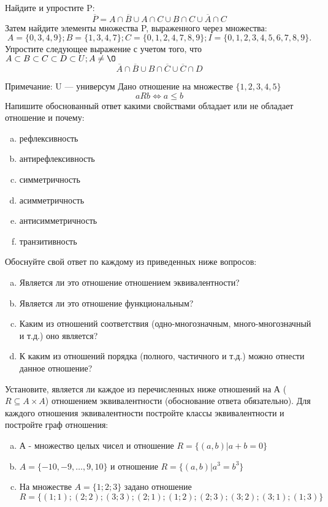\documentclass[10pt]{exam}
\begin{document}
\begin{questions}
\question
Найдите и упростите P:
\begin{equation*}
\overline{P} = A \cap \overline{B} \cup A \cap C \cup B \cap C \cup \overline{A} \cap C
\end{equation*}
Затем найдите элементы множества P, выраженного через множества:
\begin{equation*}
A = \{0, 3, 4, 9\}; 
B = \{1, 3, 4, 7\};
C = \{0, 1, 2, 4, 7, 8, 9\};
I = \{0, 1, 2, 3, 4, 5, 6, 7, 8, 9\}.
\end{equation*}\question
Упростите следующее выражение с учетом того, что $A\subset B \subset C \subset D \subset U; A \neq \O$
\begin{equation*}
\overline{A} \cap \overline{B} \cup B \cap \overline{C} \cup \overline{C} \cap D
\end{equation*}

Примечание: U — универсум\question
Дано отношение на множестве $\{1, 2, 3, 4, 5\}$ 
\begin{equation*}
aRb \iff a \leq b
\end{equation*}
Напишите обоснованный ответ какими свойствами обладает или не обладает отношение и почему:   
\begin{enumerate} [a)]\setcounter{enumi}{0}
\item рефлексивность
\item антирефлексивность
\item симметричность
\item асимметричность
\item антисимметричность
\item транзитивность
\end{enumerate}

Обоснуйте свой ответ по каждому из приведенных ниже вопросов:
\begin{enumerate} [a)]\setcounter{enumi}{0}
    \item Является ли это отношение отношением эквивалентности?
    \item Является ли это отношение функциональным?
    \item Каким из отношений соответствия (одно-многозначным, много-многозначный и т.д.) оно является?
    \item К каким из отношений порядка (полного, частичного и т.д.) можно отнести данное отношение?
\end{enumerate}


\question
Установите, является ли каждое из перечисленных ниже отношений на А ($R \subseteq A \times A$) отношением эквивалентности (обоснование ответа обязательно). Для каждого отношения эквивалентности 
постройте классы эквивалентности и постройте граф отношения:
\begin{enumerate}[a)]\setcounter{enumi}{0}
\item А - множество целых чисел и отношение $R = \{(a,b)|a + b = 0\}$
\item $A = \{-10, -9, …, 9, 10\}$ и отношение $R = \{(a,b)|a^{3} = b^{3}\}$
\item На множестве $A = \{1; 2; 3\}$ задано отношение $R = \{(1; 1); (2; 2); (3; 3); (2; 1); (1; 2); (2; 3); (3; 2); (3; 1); (1; 3)\}$


\end{enumerate}
\end{questions}
\end{document}
